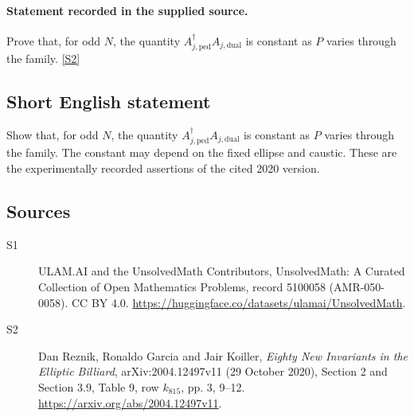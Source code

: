 \documentclass[11pt]{article}
\newcommand{\sref}[2]{\hyperlink{source:#1:#2}{[S#2]}}
\begin{document}
\paragraph{Statement recorded in the supplied source.}
Prove that, for odd $N$, the quantity $A_{j,\mathrm{ped}}^\dagger A_{j,\mathrm{dual}}$ is constant as $P$ varies through the family. \sref{5100058}{2}
\subsection{Short English statement}
Show that, for odd $N$, the quantity $A_{j,\mathrm{ped}}^\dagger A_{j,\mathrm{dual}}$ is constant as $P$ varies through the family. The constant may depend on the fixed ellipse and caustic. These are the experimentally recorded assertions of the cited 2020 version.
\subsection{Sources}
\begin{description}
\item[\hypertarget{source:5100058:1}{S1}] ULAM.AI and the UnsolvedMath Contributors, UnsolvedMath: A Curated Collection of Open Mathematics Problems, record 5100058 (AMR-050-0058). CC BY 4.0. \url{https://huggingface.co/datasets/ulamai/UnsolvedMath}.
\item[\hypertarget{source:5100058:2}{S2}] Dan Reznik, Ronaldo Garcia and Jair Koiller, \emph{Eighty New Invariants in the Elliptic Billiard}, arXiv:2004.12497v11 (29 October 2020), Section 2 and Section 3.9, Table 9, row $k_{815}$, pp. 3, 9--12. \url{https://arxiv.org/abs/2004.12497v11}.
\end{description}
\label{end:5100058}
\end{document}
